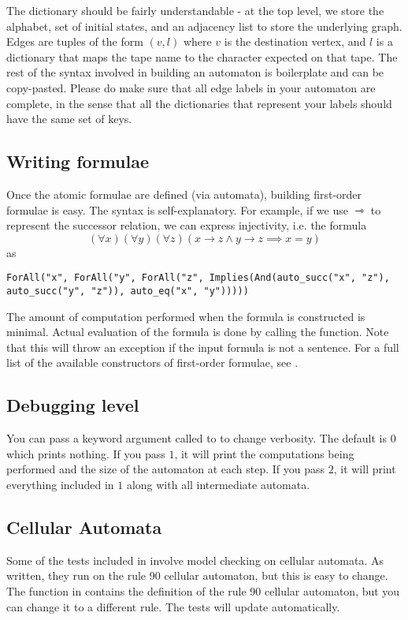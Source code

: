 \documentclass{hw}
\begin{document}
The dictionary should be fairly understandable - at the top level, we store
the alphabet, set of initial states, and an adjacency list to store the
underlying graph. Edges are tuples of the form $(v, l)$ where $v$ is the
destination vertex, and $l$ is a dictionary that maps the tape name to the
character expected on that tape. The rest of the syntax involved
in building an automaton is boilerplate and can be copy-pasted.
Please do make sure that all edge labels in your automaton are complete,
in the sense that all the dictionaries that represent your labels should
have the same set of keys.

\subsection*{Writing formulae}
Once the atomic formulae are defined (via automata), building first-order formulae
is easy. The syntax is self-explanatory. For example, if we use $\rightarrowtriangle$
to represent the successor relation, we can express injectivity, i.e. the formula
$$(\forall x)(\forall y)(\forall z)(x \rightarrow z \wedge y \rightarrow z \implies x = y)$$
as
\begin{lstlisting}
ForAll("x", ForAll("y", ForAll("z", Implies(And(auto_succ("x", "z"),
auto_succ("y", "z")), auto_eq("x", "y")))))
\end{lstlisting}
The amount of computation performed when the formula is constructed is minimal.
Actual evaluation of the formula is done by calling the  function. Note that
this will throw an exception if the input formula is not a sentence.
For a full list of the available constructors of first-order formulae, see .

\subsection*{Debugging level}
You can pass a keyword argument called  to  to change
verbosity. The default is $0$ which prints nothing. If you pass $1$, it will print
the computations being performed and the size of the automaton at each step. If
you pass $2$, it will print everything included in $1$ along with all intermediate automata.

\subsection*{Cellular Automata}
Some of the tests included in  involve model checking on
cellular automata. As written, they run on the rule 90 cellular automaton,
but this is easy to change. The function  in  contains the definition
of the rule 90 cellular automaton, but you can change it to a different rule.
The tests will update automatically.
\end{document}
